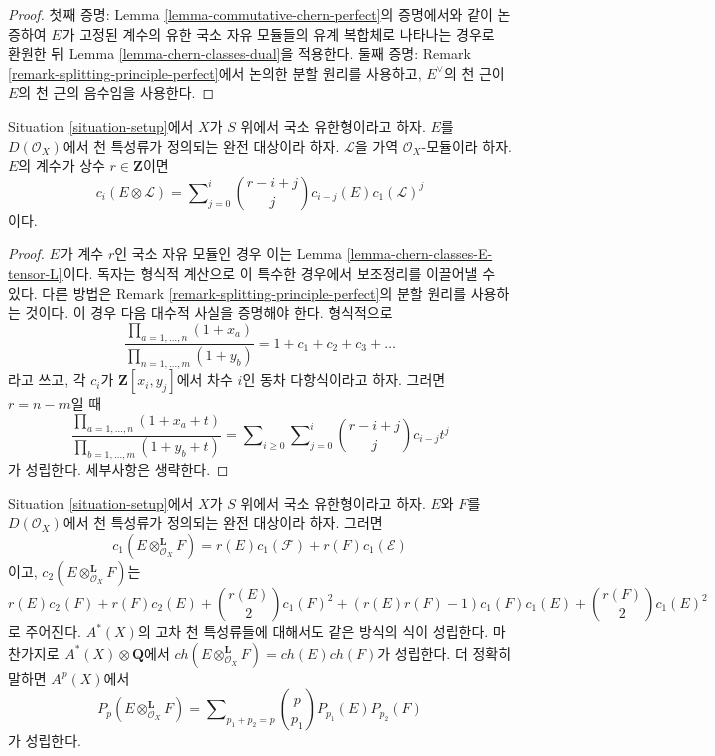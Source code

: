\begin{proof}
첫째 증명: Lemma \ref{lemma-commutative-chern-perfect}의 증명에서와
같이 논증하여 $E$가 고정된 계수의 유한 국소 자유 모듈들의 유계
복합체로 나타나는 경우로 환원한 뒤 Lemma
\ref{lemma-chern-classes-dual}을 적용한다.
둘째 증명: Remark \ref{remark-splitting-principle-perfect}에서 논의한
분할 원리를 사용하고, $E^\vee$의 천 근이 $E$의 천 근의 음수임을
사용한다.
\end{proof}

\begin{lemma}
\label{lemma-chern-class-perfect-tensor-invertible}
Situation \ref{situation-setup}에서 $X$가 $S$ 위에서 국소 유한형이라고
하자. $E$를 $D(\mathcal{O}_X)$에서 천 특성류가 정의되는 완전
대상이라 하자. $\mathcal{L}$을 가역 $\mathcal{O}_X$-모듈이라 하자.
$E$의 계수가 상수 $r \in \mathbf{Z}$이면
$$
c_i(E \otimes \mathcal{L}) =
\sum\nolimits_{j = 0}^i
\binom{r - i + j}{j} c_{i - j}(E) c_1(\mathcal{L})^j
$$
이다.
\end{lemma}

\begin{proof}
$E$가 계수 $r$인 국소 자유 모듈인 경우 이는 Lemma
\ref{lemma-chern-classes-E-tensor-L}이다. 독자는 형식적 계산으로 이
특수한 경우에서 보조정리를 이끌어낼 수 있다. 다른 방법은 Remark
\ref{remark-splitting-principle-perfect}의 분할 원리를 사용하는
것이다. 이 경우 다음 대수적 사실을 증명해야 한다. 형식적으로
$$
\frac{\prod_{a = 1, \ldots, n} (1 + x_a)}{\prod_{n = 1, \ldots, m} (1 + y_b)}
= 1 + c_1 + c_2 + c_3 + \ldots
$$
라고 쓰고, 각 $c_i$가 $\mathbf{Z}[x_i, y_j]$에서 차수 $i$인 동차
다항식이라고 하자. 그러면 $r = n - m$일 때
$$
\frac{\prod_{a = 1, \ldots, n} (1 + x_a + t)}{\prod_{b = 1, \ldots, m} (1 + y_b + t)}
= \sum\nolimits_{i \geq 0} \sum\nolimits_{j = 0}^i
\binom{r - i + j}{j} c_{i - j} t^j
$$
가 성립한다. 세부사항은 생략한다.
\end{proof}

\begin{lemma}
\label{lemma-chern-classes-perfect-tensor-product}
Situation \ref{situation-setup}에서 $X$가 $S$ 위에서 국소 유한형이라고
하자. $E$와 $F$를 $D(\mathcal{O}_X)$에서 천 특성류가 정의되는 완전
대상이라 하자. 그러면
$$
c_1(E \otimes_{\mathcal{O}_X}^\mathbf{L} F) =
r(E) c_1(\mathcal{F}) + r(F) c_1(\mathcal{E})
$$
이고, $c_2(E \otimes_{\mathcal{O}_X}^\mathbf{L} F)$는
$$
r(E) c_2(F) + r(F) c_2(E) + {r(E) \choose 2} c_1(F)^2 +
(r(E)r(F) - 1) c_1(F)c_1(E) + {r(F) \choose 2} c_1(E)^2
$$
로 주어진다. $A^*(X)$의 고차 천 특성류들에 대해서도 같은 방식의
식이 성립한다. 마찬가지로 $A^*(X) \otimes \mathbf{Q}$에서
$ch(E \otimes_{\mathcal{O}_X}^\mathbf{L} F) = ch(E) ch(F)$가
성립한다. 더 정확히 말하면 $A^p(X)$에서
$$
P_p(E \otimes_{\mathcal{O}_X}^\mathbf{L} F) = \sum\nolimits_{p_1 + p_2 = p}
{p \choose p_1} P_{p_1}(E) P_{p_2}(F)
$$
가 성립한다.
\end{lemma}

